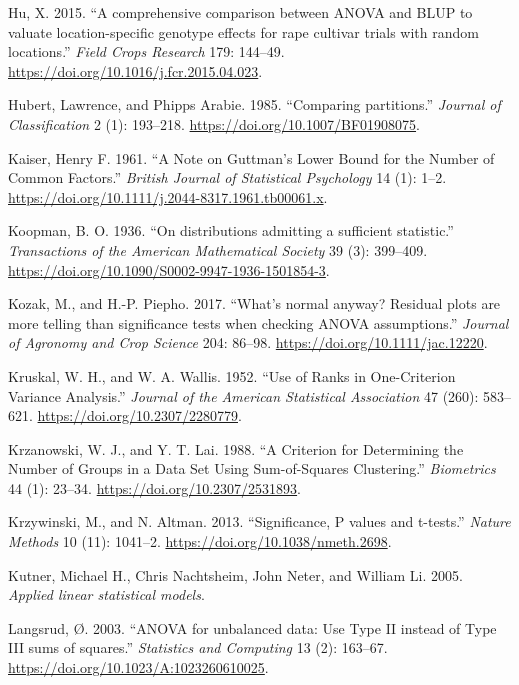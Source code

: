 \documentclass[
]{book}
\numberwithin{equation}{section}
\newlength{\cslhangindent}
\newenvironment{cslreferences}%
  {\setlength{\parindent}{0pt}%
  \everypar{\setlength{\hangindent}{\cslhangindent}}\ignorespaces}%
  {\par}
\begin{document}
\begin{cslreferences}
\leavevmode\hypertarget{ref-Hu2015}{}%
Hu, X. 2015. ``A comprehensive comparison between ANOVA and BLUP to valuate location-specific genotype effects for rape cultivar trials with random locations.'' \emph{Field Crops Research} 179: 144--49. \url{https://doi.org/10.1016/j.fcr.2015.04.023}.

\leavevmode\hypertarget{ref-Hubert1985}{}%
Hubert, Lawrence, and Phipps Arabie. 1985. ``Comparing partitions.'' \emph{Journal of Classification} 2 (1): 193--218. \url{https://doi.org/10.1007/BF01908075}.

\leavevmode\hypertarget{ref-Kaiser1961}{}%
Kaiser, Henry F. 1961. ``A Note on Guttman's Lower Bound for the Number of Common Factors.'' \emph{British Journal of Statistical Psychology} 14 (1): 1--2. \url{https://doi.org/10.1111/j.2044-8317.1961.tb00061.x}.

\leavevmode\hypertarget{ref-Koopman1936}{}%
Koopman, B. O. 1936. ``On distributions admitting a sufficient statistic.'' \emph{Transactions of the American Mathematical Society} 39 (3): 399--409. \url{https://doi.org/10.1090/S0002-9947-1936-1501854-3}.

\leavevmode\hypertarget{ref-Kozak2017}{}%
Kozak, M., and H.-P. Piepho. 2017. ``What's normal anyway? Residual plots are more telling than significance tests when checking ANOVA assumptions.'' \emph{Journal of Agronomy and Crop Science} 204: 86--98. \url{https://doi.org/10.1111/jac.12220}.

\leavevmode\hypertarget{ref-Kruskal1952}{}%
Kruskal, W. H., and W. A. Wallis. 1952. ``Use of Ranks in One-Criterion Variance Analysis.'' \emph{Journal of the American Statistical Association} 47 (260): 583--621. \url{https://doi.org/10.2307/2280779}.

\leavevmode\hypertarget{ref-Krzanowski1988}{}%
Krzanowski, W. J., and Y. T. Lai. 1988. ``A Criterion for Determining the Number of Groups in a Data Set Using Sum-of-Squares Clustering.'' \emph{Biometrics} 44 (1): 23--34. \url{https://doi.org/10.2307/2531893}.

\leavevmode\hypertarget{ref-Krzywinski2013}{}%
Krzywinski, M., and N. Altman. 2013. ``Significance, P values and t-tests.'' \emph{Nature Methods} 10 (11): 1041--2. \url{https://doi.org/10.1038/nmeth.2698}.

\leavevmode\hypertarget{ref-Kutner2005}{}%
Kutner, Michael H., Chris Nachtsheim, John Neter, and William Li. 2005. \emph{Applied linear statistical models}.

\leavevmode\hypertarget{ref-Langsrud2003}{}%
Langsrud, Ø. 2003. ``ANOVA for unbalanced data: Use Type II instead of Type III sums of squares.'' \emph{Statistics and Computing} 13 (2): 163--67. \url{https://doi.org/10.1023/A:1023260610025}.


\end{cslreferences}
\end{document}
